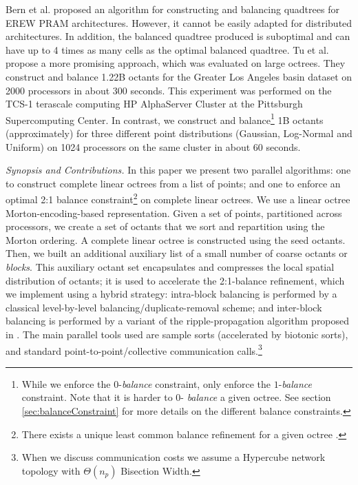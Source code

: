 Bern et al. \cite{bern99} proposed an algorithm for constructing and
balancing quadtrees for EREW PRAM architectures.  However, it cannot
be easily adapted for distributed architectures. In addition, the
balanced quadtree produced is suboptimal and can have up to 4 times as
many cells as the optimal balanced quadtree. Tu et al.\ \cite{tu05}
propose a more promising approach, which was evaluated on large
octrees. They construct and balance 1.22B octants for the Greater Los
Angeles basin dataset \cite{laData00} on 2000 processors in about 300
seconds. This experiment was performed on the TCS-1 terascale
computing HP AlphaServer Cluster at the Pittsburgh Supercomputing
Center. In contrast, we construct and balance\footnote{While we
enforce the $0$-{\em balance} constraint, \cite{tu05} only enforce the
$1$-{\em balance} constraint. Note that it is harder to $0$-{\em
balance} a given octree. See section \ref{sec:balanceConstraint}
for more details on the different balance constraints.} 1B octants
(approximately) for three different point distributions (Gaussian,
Log-Normal and Uniform) on 1024 processors on the same cluster in
about 60 seconds.

{\em Synopsis and Contributions.} In this paper we present two
parallel algorithms: one to construct complete linear octrees from a
list of points; and one to enforce an optimal 2:1 balance
constraint\footnote{There exists a unique least common balance
refinement for a given octree \cite{moore95}.} on complete linear
octrees.  We use a linear octree Morton-encoding-based representation.
Given a set of points, partitioned across processors, we create a set
of octants that we sort and repartition using the Morton ordering. A
complete linear octree is constructed using the seed octants. Then, we
built an additional auxiliary list of a small number of coarse octants
or {\em blocks}.  This auxiliary octant set encapsulates and
compresses the local spatial distribution of octants; it is used to
accelerate the 2:1-balance refinement, which we implement using a
hybrid strategy: intra-block balancing is performed by a classical
level-by-level balancing/duplicate-removal scheme; and inter-block
balancing is performed by a variant of the ripple-propagation
algorithm proposed in \cite{tu05}.  The main parallel tools used are
sample sorts (accelerated by biotonic sorts), and standard
point-to-point/collective communication calls.\footnote{When we
discuss communication costs we assume a Hypercube network topology
with $\Theta (n_p)$ Bisection Width.}

